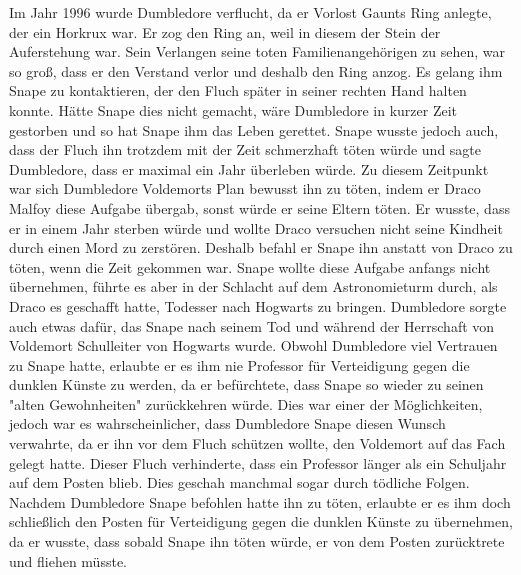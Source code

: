 \documentclass[a4paper, 10pt]{article}
\begin{document}
Im Jahr 1996 wurde Dumbledore verflucht, da er Vorlost Gaunts Ring anlegte, der ein Horkrux war. Er zog den Ring an, weil in diesem der Stein der Auferstehung war. Sein Verlangen seine toten Familienangehörigen zu sehen, war so groß, dass er den Verstand verlor und deshalb den Ring anzog. Es gelang ihm Snape zu kontaktieren, der den Fluch später in seiner rechten Hand halten konnte. Hätte Snape dies nicht gemacht, wäre Dumbledore in kurzer Zeit gestorben und so hat Snape ihm das Leben gerettet. Snape wusste jedoch auch, dass der Fluch ihn trotzdem mit der Zeit schmerzhaft töten würde und sagte Dumbledore, dass er maximal ein Jahr überleben würde. Zu diesem Zeitpunkt war sich Dumbledore Voldemorts Plan bewusst ihn zu töten, indem er Draco Malfoy diese Aufgabe übergab, sonst würde er seine Eltern töten. Er wusste, dass er in einem Jahr sterben würde und wollte Draco versuchen nicht seine Kindheit durch einen Mord zu zerstören. Deshalb befahl er Snape ihn anstatt von Draco zu töten, wenn die Zeit gekommen war. Snape wollte diese Aufgabe anfangs nicht übernehmen, führte es aber in der Schlacht auf dem Astronomieturm durch, als Draco es geschafft hatte, Todesser nach Hogwarts zu bringen. Dumbledore sorgte auch etwas dafür, das Snape nach seinem Tod und während der Herrschaft von Voldemort Schulleiter von Hogwarts wurde.
\vspace{10pt}
\newline
{}  
Obwohl Dumbledore viel Vertrauen zu Snape hatte, erlaubte er es ihm nie Professor für Verteidigung gegen die dunklen Künste zu werden, da er befürchtete, dass Snape so wieder zu seinen "alten Gewohnheiten" zurückkehren würde. Dies war einer der Möglichkeiten, jedoch war es wahrscheinlicher, dass Dumbledore Snape diesen Wunsch verwahrte, da er ihn vor dem Fluch schützen wollte, den Voldemort auf das Fach gelegt hatte. Dieser Fluch verhinderte, dass ein Professor länger als ein Schuljahr auf dem Posten blieb. Dies geschah manchmal sogar durch tödliche Folgen. Nachdem Dumbledore Snape befohlen hatte ihn zu töten, erlaubte er es ihm doch schließlich den Posten für Verteidigung gegen die dunklen Künste zu übernehmen, da er wusste, dass sobald Snape ihn töten würde, er von dem Posten zurücktrete und fliehen müsste.
\end{document}
